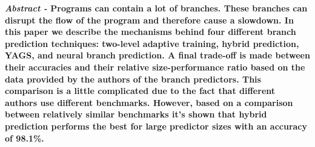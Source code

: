 \textbf{\textit{Abstract -} Programs can contain a lot of branches. These branches can disrupt the flow of the program and therefore cause a slowdown. In this paper we describe the mechanisms behind four different branch prediction techniques: two-level adaptive training, hybrid prediction, YAGS, and neural branch prediction. A final trade-off is made between their accuracies and their relative size-performance ratio based on the data provided by the authors of the branch predictors. This comparison is a little complicated due to the fact that different authors use different benchmarks. However, based on a comparison between relatively similar benchmarks it's shown that hybrid prediction performs the best for large predictor sizes with an accuracy of 98.1\%.}